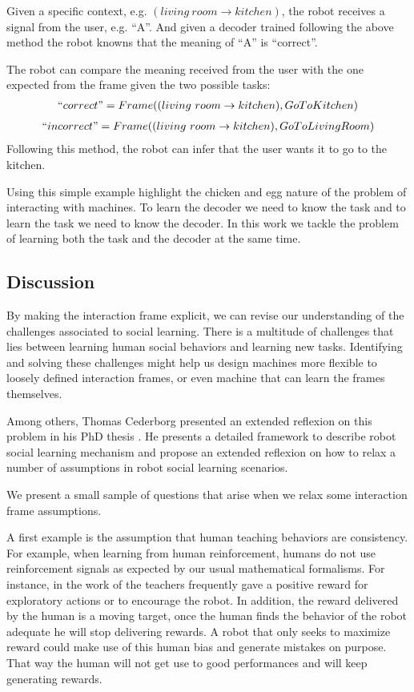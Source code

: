 Given a specific context, e.g. $(living~room \rightarrow kitchen)$, the robot receives a signal from the user, e.g. ``A''. And given a decoder trained following the above method the robot knowns that the meaning of ``A'' is ``correct''.

The robot can compare the meaning received from the user with the one expected from the frame given the two possible tasks:
%
\begin{eqnarray}
``correct" = Frame((living~room \rightarrow kitchen), Go To Kitchen) \nonumber
\end{eqnarray}
\begin{eqnarray}
``incorrect" = Frame((living~room \rightarrow kitchen), Go To Living Room) \nonumber
\end{eqnarray}
%
Following this method, the robot can infer that the user wants it to go to the kitchen.

\transition

Using this simple example highlight the chicken and egg nature of the problem of interacting with machines. To learn the decoder we need to know the task and to learn the task we need to know the decoder. In this work we tackle the problem of learning both the task and the decoder at the same time.

\subsection{Discussion}

By making the interaction frame explicit, we can revise our understanding of the challenges associated to social learning. There is a multitude of challenges that lies between learning human social behaviors and learning new tasks. Identifying and solving these challenges might help us design machines more flexible to loosely defined interaction frames, or even machine that can learn the frames themselves.

Among others, Thomas Cederborg presented an extended reflexion on this problem in his PhD thesis \cite{cederborg2014thesis}. He presents a detailed framework to describe robot social learning mechanism \cite{cederborg2013language} and propose an extended reflexion on how to relax a number of assumptions in robot social learning scenarios. 

We present a small sample of questions that arise when we relax some interaction frame assumptions.

A first example is the assumption that human teaching behaviors are consistency. For example, when learning from human reinforcement, humans do not use reinforcement signals as expected by our usual mathematical formalisms. For instance, in the work of \cite{thomaz2008teachable} the teachers frequently gave a positive reward for exploratory actions or to encourage the robot. In addition, the reward delivered by the human is a moving target, once the human finds the behavior of the robot adequate he will stop delivering rewards. A robot that only seeks to maximize reward could make use of this human bias and generate mistakes on purpose. That way the human will not get use to good performances and will keep generating rewards.

